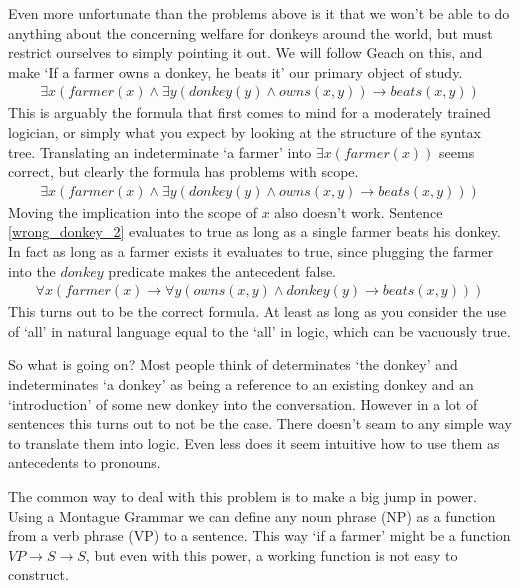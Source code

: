 \documentclass[12pt]{article}
\begin{document}
Even more unfortunate than the problems above is it that we won't be able to do anything about the concerning welfare for donkeys around the world\cite{donkey2013sanctuary}, but must restrict ourselves to simply pointing it out. We will follow Geach\cite{geach1962reference} on this, and make `If a farmer owns a donkey, he beats it' our primary object of study.
%
\begin{align}
\exists x (farmer(x) \wedge \exists y (donkey(y)\wedge owns(x,y)) \rightarrow beats(x,y))
\end{align}
%
This is arguably the formula that first comes to mind for a moderately trained logician, or simply what you expect by looking at the structure of the syntax tree. Translating an indeterminate `a farmer' into $\exists x(farmer(x))$ seems correct, but clearly the formula has problems with scope.
%
\begin{align}
\exists x (farmer(x) \wedge \exists y (donkey(y)\wedge owns(x,y) \rightarrow beats(x,y))) \label{wrong_donkey_2}
\end{align}
%
Moving the implication into the scope of $x$ also doesn't work. Sentence \eqref{wrong_donkey_2} evaluates to true as long as a single farmer beats his donkey. In fact as long as a farmer exists it evaluates to true, since plugging the farmer into the $donkey$ predicate makes the antecedent false.
%
\begin{align}
\forall x (farmer(x) \rightarrow \forall y ( owns(x,y) \wedge donkey(y) \rightarrow beats(x,y))) \label{correct_donkey}
\end{align}
%
This turns out to be the correct formula. At least as long as you consider the use of `all' in natural language equal to the `all' in logic, which can be vacuously true.

So what is going on? Most people think of determinates `the donkey' and indeterminates `a donkey' as being a reference to an existing donkey and an `introduction' of some new donkey into the conversation. However in a lot of sentences this turns out to not be the case. There doesn't seam to any simple way to translate them into logic. Even less does it seem intuitive how to use them as antecedents to pronouns.

The common way to deal with this problem is to make a big jump in power. Using a Montague Grammar we can define any noun phrase (NP) as a function from a verb phrase (VP) to a sentence. This way `if a farmer' might be a function $VP \to S \to S$, but even with this power, a working function is not easy to construct\cite{montague1973proper}.
\end{document}
